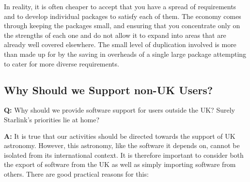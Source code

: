 \documentclass[twoside,11pt]{article}
\begin{document}
In reality, it is often cheaper to accept that you have a spread of
requirements and to develop individual packages to satisfy each of
them. The economy comes through keeping the packages small, and
ensuring that you concentrate only on the strengths of each one and do
not allow it to expand into areas that are already well covered
elsewhere. The small level of duplication involved is more than made
up for by the saving in overheads of a single large package attempting
to cater for more diverse requirements.

\subsection{\label{foreign}Why Should we Support non-UK Users?}

{\Large \bf Q:} Why should we provide software support for users outside
the UK? Surely Starlink's priorities lie at home?

{\Large \bf A:} It is true that our activities should be
directed towards the support of UK astronomy. However, this astronomy,
like the software it depends on, cannot be isolated from its
international context. It is therefore important to consider both the
export of software from the UK as well as simply importing software
from others. There are good practical reasons for this:
\end{document}
